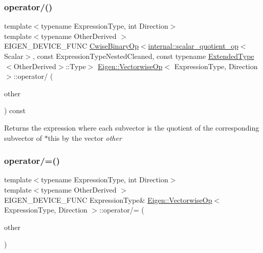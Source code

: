 \subsubsection{\texorpdfstring{operator/()}{operator/()}}
{\footnotesize\ttfamily template$<$typename Expression\+Type, int Direction$>$ \\
template$<$typename Other\+Derived $>$ \\
E\+I\+G\+E\+N\+\_\+\+D\+E\+V\+I\+C\+E\+\_\+\+F\+U\+NC \mbox{\hyperlink{class_eigen_1_1_cwise_binary_op}{Cwise\+Binary\+Op}}$<$\mbox{\hyperlink{struct_eigen_1_1internal_1_1scalar__quotient__op}{internal\+::scalar\+\_\+quotient\+\_\+op}}$<$Scalar$>$, const Expression\+Type\+Nested\+Cleaned, const typename \mbox{\hyperlink{struct_eigen_1_1_vectorwise_op_1_1_extended_type}{Extended\+Type}}$<$Other\+Derived$>$\+::Type$>$ \mbox{\hyperlink{class_eigen_1_1_vectorwise_op}{Eigen\+::\+Vectorwise\+Op}}$<$ Expression\+Type, Direction $>$\+::operator/ (\begin{DoxyParamCaption}\item[{const \mbox{\hyperlink{class_eigen_1_1_dense_base}{Dense\+Base}}$<$ Other\+Derived $>$ \&}]{other }\end{DoxyParamCaption}) const\hspace{0.3cm}{\ttfamily [inline]}}

Returns the expression where each subvector is the quotient of the corresponding subvector of {\ttfamily $\ast$this} by the vector {\itshape other} \mbox{\label{class_eigen_1_1_vectorwise_op_ac04267f84ef1c52d88f452667cf757ae}} 
\subsubsection{\texorpdfstring{operator/=()}{operator/=()}}
{\footnotesize\ttfamily template$<$typename Expression\+Type, int Direction$>$ \\
template$<$typename Other\+Derived $>$ \\
E\+I\+G\+E\+N\+\_\+\+D\+E\+V\+I\+C\+E\+\_\+\+F\+U\+NC Expression\+Type\& \mbox{\hyperlink{class_eigen_1_1_vectorwise_op}{Eigen\+::\+Vectorwise\+Op}}$<$ Expression\+Type, Direction $>$\+::operator/= (\begin{DoxyParamCaption}\item[{const \mbox{\hyperlink{class_eigen_1_1_dense_base}{Dense\+Base}}$<$ Other\+Derived $>$ \&}]{other }\end{DoxyParamCaption})\hspace{0.3cm}{\ttfamily [inline]}}

